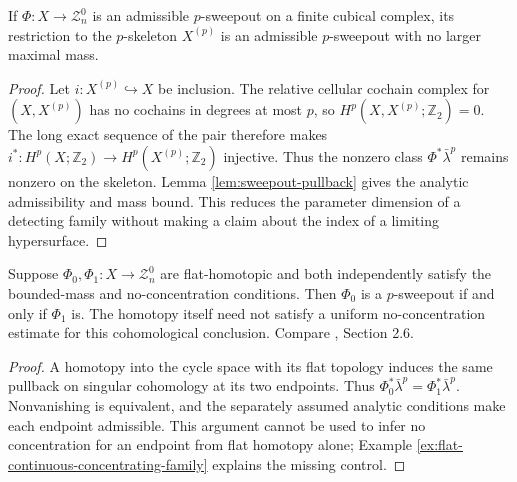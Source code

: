 \begin{proposition}\label{prop:sweepout-skeleton}
If $\Phi:X\to\mathcal Z_n^0$ is an admissible $p$-sweepout on a finite cubical complex, its restriction to the $p$-skeleton $X^{(p)}$ is an admissible $p$-sweepout with no larger maximal mass.
\end{proposition}
\begin{proof}
Let $i:X^{(p)}\hookrightarrow X$ be inclusion. The relative cellular cochain complex for $(X,X^{(p)})$ has no cochains in degrees at most $p$, so $H^p(X,X^{(p)};\mathbb Z_2)=0$. The long exact sequence of the pair therefore makes $i^*:H^p(X;\mathbb Z_2)\to H^p(X^{(p)};\mathbb Z_2)$ injective. Thus the nonzero class $\Phi^*\bar\lambda^p$ remains nonzero on the skeleton. Lemma \ref{lem:sweepout-pullback} gives the analytic admissibility and mass bound. This reduces the parameter dimension of a detecting family without making a claim about the index of a limiting hypersurface.
\end{proof}

\begin{proposition}\label{prop:sweepout-homotopy-detection}
Suppose $\Phi_0,\Phi_1:X\to\mathcal Z_n^0$ are flat-homotopic and both independently satisfy the bounded-mass and no-concentration conditions. Then $\Phi_0$ is a $p$-sweepout if and only if $\Phi_1$ is. The homotopy itself need not satisfy a uniform no-concentration estimate for this cohomological conclusion. Compare \cite{LMN}, Section 2.6.
\end{proposition}
\begin{proof}
A homotopy into the cycle space with its flat topology induces the same pullback on singular cohomology at its two endpoints. Thus $\Phi_0^*\bar\lambda^p=\Phi_1^*\bar\lambda^p$. Nonvanishing is equivalent, and the separately assumed analytic conditions make each endpoint admissible. This argument cannot be used to infer no concentration for an endpoint from flat homotopy alone; Example \ref{ex:flat-continuous-concentrating-family} explains the missing control.
\end{proof}


